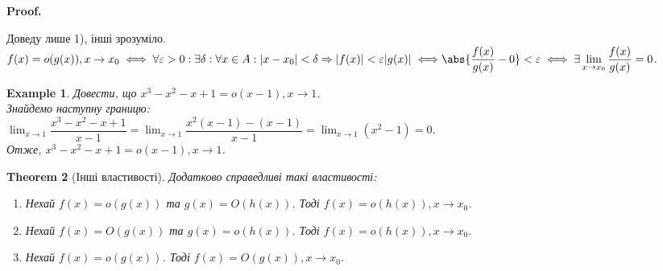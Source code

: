 \documentclass[a4paper, 14pt]{article}
\makeatletter
\def\qed{$\blacksquare$}
\theoremstyle{theoremdd}
\newtheorem{theorem}{Theorem}[subsection]
\theoremstyle{theoremdd}
\theoremstyle{theoremdd}
\theoremstyle{theoremdd}
\newtheorem{example}[theorem]{Example}
\theoremstyle{theoremdd}
\theoremstyle{theoremdd}
\theoremstyle{theoremdd}
\theoremstyle{theoremdd}
\renewenvironment{proof}[1][Proof.\\]{\par
\pushQED{\hfill \qed}%
\normalfont \topsep6\p@\@plus6\p@\relax
\trivlist
\item\relax
{\bfseries
#1\@addpunct{.}}\hspace\labelsep\ignorespaces
}{%
\popQED\endtrivlist\@endpefalse
}
\makeatother
\begin{document}
\begin{proof}
Доведу лише 1), інші зрозуміло.\\
$f(x) = o(g(x)),x \to x_0 \iff \forall \varepsilon>0: \exists \delta: \forall x \in A: |x-x_0| < \delta \Rightarrow |f(x)| < \varepsilon |g(x)| \iff \\ \displaystyle \abs{\frac{f(x)}{g(x)} - 0} < \varepsilon \iff \exists \lim_{x \to x_0} \frac{f(x)}{g(x)} = 0$.
\end{proof}

\begin{example}
Довести, що $x^3 - x^2 - x + 1 = o(x-1), x \to 1$.\\
Знайдемо наступну границю:\\
$\displaystyle \lim_{x \to 1} \dfrac{x^3-x^2-x+1}{x-1} = \lim_{x \to 1} \dfrac{x^2(x-1)-(x-1)}{x-1} = \lim_{x \to 1} (x^2-1) = 0$.\\
Отже, $x^3 - x^2 - x + 1 = o(x-1), x \to 1$.
\\ %
\end{example}

\begin{theorem}[Інші властивості]
Додатково справедливі такі властивості:
\begin{enumerate}[nosep,wide=0pt,label={\arabic*)}]
\item Нехай $f(x) = o(g(x))$ та $g(x) = O(h(x))$. Тоді $f(x) = o(h(x)), x \to x_0$.
\item Нехай $f(x) = O(g(x))$ та $g(x) = o(h(x))$. Тоді $f(x) = o(h(x)), x \to x_0$.
\item Нехай $f(x) = o(g(x))$. Тоді $f(x) = O(g(x)), x \to x_0$.
\end{enumerate}
\end{theorem}
\end{document}
